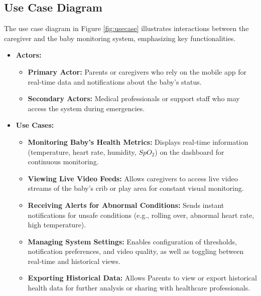 \documentclass[12pt,a4paper]{report}
\begin{document}
\subsection{Use Case Diagram}
The use case diagram in Figure \ref{fig:usecase} illustrates interactions between the caregiver and the baby monitoring system, emphasizing key functionalities.

\begin{itemize}
  \item \textbf{Actors:}
        \begin{itemize}
          \item \textbf{Primary Actor:} Parents or caregivers who rely on the mobile app for real-time data and notifications about the baby's status.
          \item \textbf{Secondary Actors:} Medical professionals or support staff who may access the system during emergencies.
        \end{itemize}

  \item \textbf{Use Cases:}
        \begin{itemize}
          \item \textbf{Monitoring Baby’s Health Metrics:} Displays real-time information (temperature, heart rate, humidity, $SpO_2$) on the dashboard for continuous monitoring.
          \item \textbf{Viewing Live Video Feeds:} Allows caregivers to access live video streams of the baby’s crib or play area for constant visual monitoring.
          \item \textbf{Receiving Alerts for Abnormal Conditions:} Sends instant notifications for unsafe conditions (e.g., rolling over, abnormal heart rate, high temperature).
          \item \textbf{Managing System Settings:} Enables configuration of thresholds, notification preferences, and video quality, as well as toggling between real-time and historical views.
          \item \textbf{Exporting Historical Data:} Allows Parents to view or export historical health data for further analysis or sharing with healthcare professionals.
        \end{itemize}
\end{itemize}
\end{document}
